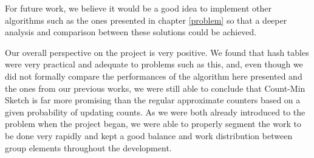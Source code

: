 \documentclass[shortpaper]{revdetua}
\begin{document}
For future work, we believe it would be a good idea to implement other algorithms such as the ones presented in chapter \ref{problem} so that a deeper analysis 
and comparison between these solutions could be achieved.

Our overall perspective on the project is very positive.
We found that hash tables were very practical and adequate to problems such as this, and, even though we did not formally compare the performances of the 
algorithm here presented and the ones from our previous works, we were still able to conclude that Count-Min Sketch is far more promising than the regular 
approximate counters based on a given probability of updating counts.
As we were both already introduced to the problem when the project began, we were able to properly segment the work to be done very rapidly and kept a good 
balance and work distribution between group elements throughout the development.


 

\newpage
\textbf{ }
\newpage
\appendix
\end{document}
